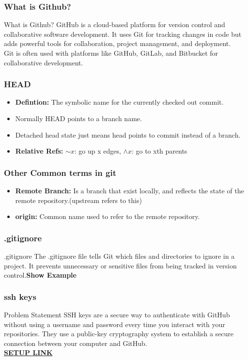 \documentclass{beamer}
\begin{document}
\begin{frame}\frametitle{What is Github?}
\begin{block}{What is Github?}
GitHub is a cloud-based platform for version control and collaborative software
development. It uses Git for tracking changes in code but adds powerful tools 
for collaboration, project management, and deployment.\\
Git is often used with platforms like GitHub, GitLab, and Bitbucket for 
collaborative development. 
\end{block}
\end{frame}


\begin{frame}\frametitle{HEAD}
\begin{itemize}
\item \textbf{Defintion:} The symbolic name for the currently checked out commit.
\item Normally HEAD points to a branch name.
\item Detached head state just means head points to commit instead of a branch.
\item \textbf{Relative Refs:} $\sim x$: go up x edges,  $\wedge x$: go to xth parents 
\end{itemize}
\end{frame}


\begin{frame}\frametitle{Other Common terms in git}
\begin{itemize}
\item \textbf{Remote Branch:} Is a branch that exist locally, and reflects the state of the remote repository.(upstream refers to this)
\item \textbf{origin:} Common name used to refer to the remote repository.
\end{itemize}
\end{frame}


\begin{frame}\frametitle{.gitignore}
\begin{block}{.gitignore}
The .gitignore file tells Git which files and directories to ignore in a 
project. It prevents unnecessary or sensitive files from being tracked in
version control.\textbf{Show Example}
\end{block}
\end{frame}
    

\begin{frame}\frametitle{ssh keys}
\begin{block}{Problem Statement}
SSH keys are a secure way to authenticate with GitHub without using a username
and password every time you interact with your repositories. They use a 
public-key cryptography system to establish a secure connection between your
computer and GitHub.\\ 
\href{https://docs.github.com/en/authentication/connecting-to-github-with-ssh/adding-a-new-ssh-key-to-your-github-account}{\textbf{SETUP LINK}}
\end{block}
\end{frame}
\end{document}
